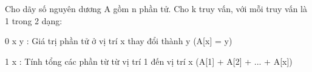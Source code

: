 Cho dãy số nguyên dương A gồm n phần tử. Cho k truy vấn, với mỗi truy vấn là 1 trong 2 dạng:

0 x y : Giá trị phần tử ở vị trí x thay đổi thành y (A[x] = y)

1 x : Tính tổng các phần từ từ vị trí 1 đến vị trí x (A[1] + A[2] + ... + A[x])
